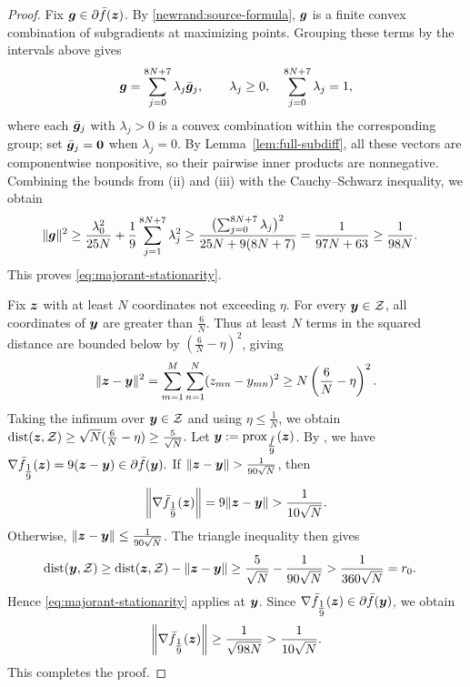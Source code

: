 \begin{proof}
Fix $\bm{g}\in\partial \bar f(\bm{z})$.
By \eqref{newrand:source-formula}, $\bm{g}$ is a finite
convex combination of subgradients at maximizing
points.
Grouping these terms by the intervals above gives
\[
 \bm{g}=\sum_{j=0}^{8N+7}\lambda_j\bar{\bm{g}}_j,
 \qquad
 \lambda_j\ge0,\quad
 \sum_{j=0}^{8N+7}\lambda_j=1,
\]
where each $\bar{\bm{g}}_j$ with $\lambda_j>0$
is a convex combination within the corresponding
group; set $\bar{\bm{g}}_j={\mathbf 0}$ when $\lambda_j=0$.
By Lemma~\ref{lem:full-subdiff}, all these vectors
are componentwise nonpositive, so their pairwise
inner products are nonnegative. Combining
the bounds from (ii) and (iii) with the Cauchy–Schwarz inequality, we obtain
\[
\begin{aligned}
 \|\bm{g}\|^2
 &\ge
 \frac{\lambda_0^2}{25N}
 +\frac19\sum_{j=1}^{8N+7}\lambda_j^2\ge
 \frac{\bigl(\sum_{j=0}^{8N+7}\lambda_j\bigr)^2}
 {25N+9(8N+7)}
 =\frac1{97N+63}
 \ge\frac1{98N}.
\end{aligned}
\]
This proves \eqref{eq:majorant-stationarity}.


Fix $\bm{z}$ with at least $N$ coordinates not exceeding
$\eta$. For every $\bm{y}\in\mathcal Z$, all coordinates
of $\bm{y}$ are greater than $\tfrac6N$.
Thus at least $N$ terms in the squared distance
are bounded below by $(\tfrac6N-\eta)^2$, giving
\[
 \|\bm{z}-\bm{y}\|^2
 =\sum_{m=1}^M\sum_{n=1}^N(z_{mn}-y_{mn})^2
 \ge N\left(\frac6N-\eta\right)^2.
\]
Taking the infimum over $\bm{y}\in\mathcal Z$ and
using $\eta\le\tfrac1N$, we obtain
$
 \operatorname{dist}(\bm{z},\mathcal Z)
 \ge\sqrt N(\tfrac6N-\eta)
 \ge\tfrac5{\sqrt N}.
$
Let $\bm{y}:=\operatorname{prox}_{\tfrac{\bar f}{9}}(\bm{z})$.
By \cite[Lemma~2.2]{DavisDrusvyatskiy2019}, we have
$
 \nabla\bar f_{\tfrac19}(\bm{z})
 =9(\bm{z}-\bm{y})\in\partial\bar f(\bm{y}).
$
If $\|\z-\bm y\|>\tfrac1{90\sqrt N}$, then
\[
 \left\|\nabla \bar f_{\tfrac19}(\bm{z})\right\|
 =9\|\bm{z}-\bm y\|
 >\frac1{10\sqrt N}.
\]
Otherwise, $\|\bm{z}-\bm y\|\le\tfrac1{90\sqrt N}$.
The triangle inequality then gives
\[
\begin{aligned}
 \operatorname{dist}(\bm y,\mathcal Z)
 &\ge\operatorname{dist}(\bm{z},\mathcal Z)
      -\|\bm{z}-\bm y\|\ge\frac5{\sqrt N}-\frac1{90\sqrt N}
 >\frac1{360\sqrt N}
 =r_0.
\end{aligned}
\]
Hence \eqref{eq:majorant-stationarity} applies
at $\bm{y}$. Since
$\nabla \bar f_{\tfrac19}(\bm{z})\in\partial \bar f(\bm y)$,
we obtain
\[
 \left\|\nabla \bar f_{\tfrac19}(\bm{z})\right\|
 \ge\frac1{\sqrt{98N}}
 >\frac1{10\sqrt N}.
\]
This completes the proof.
\end{proof}


